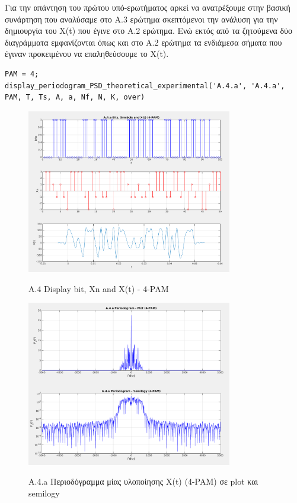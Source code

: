 \documentclass[11pt]{article}
\begin{document}
    \par \noindent
    Για την απάντηση του πρώτου υπό-ερωτήματος αρκεί να ανατρέξουμε στην βασική συνάρτηση που αναλύσαμε στο Α.3 ερώτημα σκεπτόμενοι την ανάλυση για την δημιουργία του X(t) που έγινε στο Α.2 ερώτημα.
    Ενώ εκτός από τα ζητούμενα δύο διαγράμματα εμφανίζονται όπως και στο A.2 ερώτημα τα ενδιάμεσα σήματα που έγιναν προκειμένου να επαληθεύσουμε το X(t).
    
    \begin{lstlisting}[caption = {A.4.a Periodogram - Theoretical and Experimental PSD}]
PAM = 4;
display_periodogram_PSD_theoretical_experimental('A.4.a', 'A.4.a', PAM, T, Ts, A, a, Nf, N, K, over)
    \end{lstlisting}
    
    \begin{figure}[H]
        \centering
        \includegraphics[scale=0.5, width=0.8\textwidth]{photos/A.4 - create Xt 4-PAM.png} \\
        \caption{A.4 Display bit, Xn and X(t) - 4-PAM}
    \end{figure}
    
    \begin{figure}[H]
        \centering
        \includegraphics[scale=0.5, width=0.8\textwidth]{photos/A.4.a Periodogram 4-PAM.png} \\
        \caption{A.4.a Περιοδόγραμμα μίας υλοποίησης X(t) (4-PAM) σε plot και semilogy}
    \end{figure}
    
\end{document}
